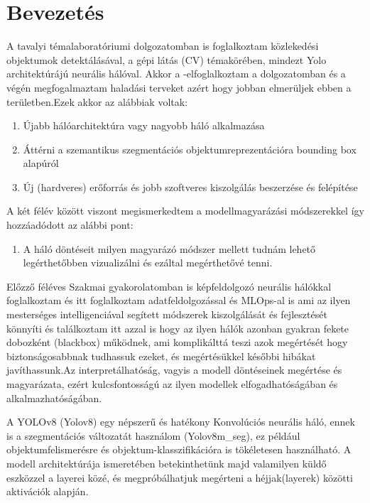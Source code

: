 \documentclass[12pt,oneside,a4paper]{article}
\title{\titletext}
\author{Nyilas Péter}
\date{\today}
\newcommand{\newsection}[1]{\clearpage\section{#1}}\label{makro}
\theoremstyle{remark}
\begin{document}
\maketitle
\newpage
\tableofcontents\label{ossz:tartalomjegyzek}
\newpage
\newsection{Bevezetés}\label{sec:bevezetes}
\pagestyle{fancy}
    A tavalyi témalaboratóriumi dolgozatomban is foglalkoztam közlekedési objektumok detektálásával,
    a gépi látás (\ac{CV}) témakörében, mindezt Yolo architektúrájú neurális hálóval. Akkor a
-elfoglalkoztam a dolgozatomban és a végén megfogalmaztam haladási terveket azért hogy jobban elmerüljek ebben a területben.Ezek akkor az alábbiak voltak:
\begin{enumerate}[label=\alph*., start=1]\label{enum:tervek}
    \item Újabb hálóarchitektúra vagy nagyobb háló alkalmazása
    \item Áttérni a szemantikus szegmentációs objektumreprezentációra bounding box alapúról
    \item Új (hardveres) erőforrás és jobb szoftveres kiszolgálás beszerzése és felépítése
\end{enumerate}
A két félév között viszont megismerkedtem a modellmagyarázási módszerekkel így hozzáadódott az alábbi pont:
\begin{enumerate}[label=\alph*., start=3]
    \item A háló döntéseit milyen magyarázó módszer mellett tudnám lehető legérthetőbben vizualizálni és ezáltal megérthetővé tenni.
\end{enumerate}

    Előzző féléves Szakmai gyakorolatomban is képfeldolgozó neurális hálókkal foglalkoztam és itt foglalkoztam adatfeldolgozással és MLOps-al is ami az ilyen mesterséges intelligenciával segített módszerek kiszolgálását és fejlesztését könnyíti és találkoztam itt azzal is hogy az ilyen
    hálók azonban gyakran fekete dobozként (blackbox) működnek, ami komplikálttá teszi azok megértését  hogy biztonságosabbnak tudhassuk ezeket,
    és megértésükkel későbbi hibákat javíthassunk.Az interpretálhatóság, vagyis a modell döntéseinek megértése
    és magyarázata, ezért kulcsfontosságú az ilyen modellek elfogadhatóságában és alkalmazhatóságában.

    A YOLOv8 (\gls{Yolov8}) egy népszerű és hatékony Konvolúciós neurális háló,
    ennek is a szegmentációs változatát használom (Yolov8m\_seg), ez
    például objektumfelismerésre és objektum-klasszifikációra is tökéletesen használható.
    A modell architektúrája ismeretében betekinthetünk majd valamilyen küldő eszközzel a layerei közé, és megpróbálhatjuk megérteni a héjjak(layerek) közötti aktivációk alapján.
\end{document}
